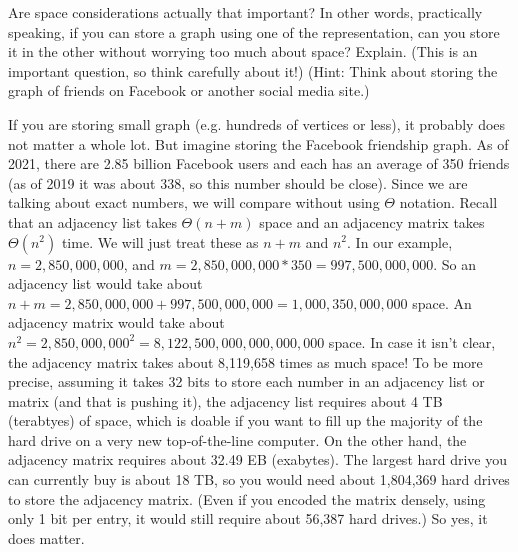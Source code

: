 \begin{requ}
Are space considerations actually that important? In other words, practically speaking, if you can store a graph 
using one of the representation, can you store it in the other without worrying too much about space? Explain.
(This is an important question, so think carefully about it!) (Hint: Think about storing the graph of friends on Facebook
or another social media site.)
\begin{requanswer}
If you are storing small graph (e.g. hundreds of vertices or less), it probably does not matter a whole lot.
But imagine storing the Facebook friendship graph. As of 2021, there are 2.85 billion Facebook users
and each has an average of 350 friends (as of 2019 it was about 338, so this number should be close).
Since we are talking about exact numbers, we will compare without using $\Theta$ notation.
Recall that an adjacency list  takes $\Theta(n+m)$ space and an adjacency matrix takes $\Theta(n^2)$ time.
We will just treat these as $n+m$ and $n^2$.
In our example, $n=2,850,000,000$, and $m=2,850,000,000*350=997,500,000,000$.
So an adjacency list would take about $n+m=2,850,000,000+997,500,000,000=1,000,350,000,000$ space.
An adjacency matrix would take about $n^2=2,850,000,000^2=8,122,500,000,000,000,000$ space.
In case it isn't clear, the adjacency matrix takes about 8,119,658 times as much space!
To be more precise, assuming it takes 32 bits to store each number in an adjacency list or matrix 
(and that is pushing it), 
the adjacency list requires about 4 TB (terabtyes) of space, which is doable if you want to fill up the
majority of the hard drive on a very new top-of-the-line computer.
On the other hand, the adjacency matrix requires about 32.49 EB (exabytes).
The largest hard drive you can currently buy is about 18 TB, so you would need about 1,804,369
hard drives to store the adjacency matrix. (Even if you encoded the matrix densely, using only 1 bit per entry,
it would still require about 56,387 hard drives.)
So yes, it does matter.
\end{requanswer}
\end{requ}

